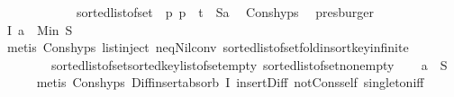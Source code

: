 \begin{isabellebody}
\ \ \ \ \ \ \ \ \ \ \ \ sorted{\isacharunderscore}{\kern0pt}list{\isacharunderscore}{\kern0pt}of{\isacharunderscore}{\kern0pt}set\ {\isacharparenleft}{\kern0pt}{\isacharparenleft}{\kern0pt}{\isasymlambda}\ p{\isachardot}{\kern0pt}\ p\ {\isacharplus}{\kern0pt}\ t{\isacharparenright}{\kern0pt}\ {\isacharbackquote}{\kern0pt}\ {\isacharparenleft}{\kern0pt}S{\isacharminus}{\kern0pt}{\isacharbraceleft}{\kern0pt}a{\isacharbraceright}{\kern0pt}{\isacharparenright}{\kern0pt}{\isacharparenright}{\kern0pt}{\isachardoublequoteclose}\ \isamarkupfalse%
\ Cons{\isachardot}{\kern0pt}hyps{\isacharparenleft}{\kern0pt}{}{\isacharcomma}{\kern0pt}{}{\isacharparenright}{\kern0pt}\ \isamarkupfalse%
\ presburger\isanewline
\ \ \isamarkupfalse%
\ I{}{\isacharcolon}{\kern0pt}\ {\isachardoublequoteopen}a\ {\isacharequal}{\kern0pt}\ Min\ S{\isachardoublequoteclose}\isanewline
\ \ \ \ \isamarkupfalse%
\ {\isacharparenleft}{\kern0pt}metis\ Cons{\isachardot}{\kern0pt}hyps{\isacharparenleft}{\kern0pt}{}{\isacharparenright}{\kern0pt}\ list{\isachardot}{\kern0pt}inject\ neq{\isacharunderscore}{\kern0pt}Nil{\isacharunderscore}{\kern0pt}conv\ sorted{\isacharunderscore}{\kern0pt}list{\isacharunderscore}{\kern0pt}of{\isacharunderscore}{\kern0pt}set{\isachardot}{\kern0pt}fold{\isacharunderscore}{\kern0pt}insort{\isacharunderscore}{\kern0pt}key{\isachardot}{\kern0pt}infinite\isanewline
\ \ \ \ \ \ \ \ sorted{\isacharunderscore}{\kern0pt}list{\isacharunderscore}{\kern0pt}of{\isacharunderscore}{\kern0pt}set{\isachardot}{\kern0pt}sorted{\isacharunderscore}{\kern0pt}key{\isacharunderscore}{\kern0pt}list{\isacharunderscore}{\kern0pt}of{\isacharunderscore}{\kern0pt}set{\isacharunderscore}{\kern0pt}empty\ sorted{\isacharunderscore}{\kern0pt}list{\isacharunderscore}{\kern0pt}of{\isacharunderscore}{\kern0pt}set{\isacharunderscore}{\kern0pt}nonempty{\isacharparenright}{\kern0pt}\isanewline
\ \ \isamarkupfalse%
\ {\isachardoublequoteopen}a\ {\isasymin}\ S{\isachardoublequoteclose}\isanewline
\ \ \ \ \isamarkupfalse%
\ {\isacharparenleft}{\kern0pt}metis\ Cons{\isachardot}{\kern0pt}hyps{\isacharparenleft}{\kern0pt}{}{\isacharparenright}{\kern0pt}\ Diff{\isacharunderscore}{\kern0pt}insert{\isacharunderscore}{\kern0pt}absorb\ I{}\ insert{\isacharunderscore}{\kern0pt}Diff{}\ not{\isacharunderscore}{\kern0pt}Cons{\isacharunderscore}{\kern0pt}self{}\ singleton{\isacharunderscore}{\kern0pt}iff{\isacharparenright}{\kern0pt}\isanewline

\end{isabellebody}
